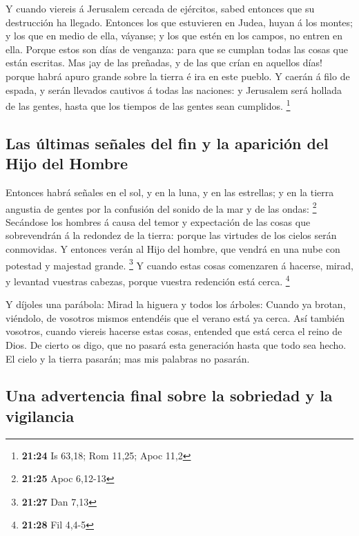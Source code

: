  Y cuando viereis á Jerusalem cercada de ejércitos, sabed
entonces que su destrucción ha llegado.  Entonces los que
estuvieren en Judea, huyan á los montes; y los que en medio de ella,
váyanse; y los que estén en los campos, no entren en ella.
 Porque estos son días de venganza: para que se cumplan
todas las cosas que están escritas.  Mas ¡ay de las
preñadas, y de las que crían en aquellos días! porque habrá apuro grande
sobre la tierra é ira en este pueblo.  Y caerán á filo de
espada, y serán llevados cautivos á todas las naciones: y Jerusalem será
hollada de las gentes, hasta que los tiempos de las gentes sean
cumplidos. \footnote{\textbf{21:24} Is 63,18; Rom 11,25; Apoc 11,2}

\hypertarget{las-uxfaltimas-seuxf1ales-del-fin-y-la-apariciuxf3n-del-hijo-del-hombre}{%
\subsection{Las últimas señales del fin y la aparición del Hijo del
Hombre}\label{las-uxfaltimas-seuxf1ales-del-fin-y-la-apariciuxf3n-del-hijo-del-hombre}}

 Entonces habrá señales en el sol, y en la luna, y en las
estrellas; y en la tierra angustia de gentes por la confusión del sonido
de la mar y de las ondas: \footnote{\textbf{21:25} Apoc 6,12-13}
 Secándose los hombres á causa del temor y expectación de
las cosas que sobrevendrán á la redondez de la tierra: porque las
virtudes de los cielos serán conmovidas.  Y entonces
verán al Hijo del hombre, que vendrá en una nube con potestad y majestad
grande. \footnote{\textbf{21:27} Dan 7,13}  Y cuando
estas cosas comenzaren á hacerse, mirad, y levantad vuestras cabezas,
porque vuestra redención está cerca. \footnote{\textbf{21:28} Fil 4,4-5}

 Y díjoles una parábola: Mirad la higuera y todos los
árboles:  Cuando ya brotan, viéndolo, de vosotros mismos
entendéis que el verano está ya cerca.  Así también
vosotros, cuando viereis hacerse estas cosas, entended que está cerca el
reino de Dios.  De cierto os digo, que no pasará esta
generación hasta que todo sea hecho.  El cielo y la
tierra pasarán; mas mis palabras no pasarán.

\hypertarget{una-advertencia-final-sobre-la-sobriedad-y-la-vigilancia}{%
\subsection{Una advertencia final sobre la sobriedad y la
vigilancia}\label{una-advertencia-final-sobre-la-sobriedad-y-la-vigilancia}}

